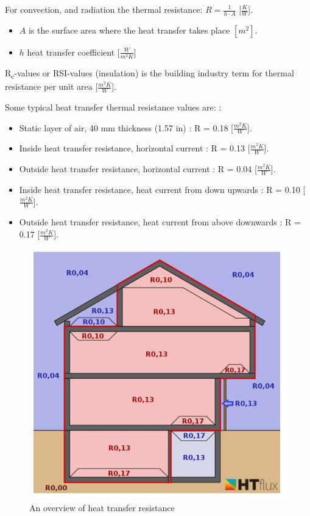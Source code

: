 For convection, and radiation the thermal resistance: $R = \frac{1}{h \cdot A}$ [$\frac{K}{W}$].

\begin{itemize}
    \item $A$ is the surface area where the heat transfer takes place $[m^2]$.
    \item $h$  heat transfer coefficient  [$\frac{W}{m^2K}$]
\end{itemize}

R\textsubscript{c}-values or RSI-values (insulation) is the building industry term for thermal resistance per unit area \cite{Rvalues_insulation} [$\frac{m^2K}{W}$].

Some typical heat transfer thermal resistance values are: \cite{OVERALL}: 

\begin{itemize}
	\item Static layer of air, 40 mm thickness (1.57 in)  : R = 0.18 [$\frac{m^2K}{W}$].
	\item Inside heat transfer resistance, horizontal current : R = 0.13 [$\frac{m^2K}{W}$]. 
	\item Outside heat transfer resistance, horizontal current : R = 0.04 [$\frac{m^2K}{W}$].
	\item Inside heat transfer resistance, heat current from down upwards : R = 0.10 [$\frac{m^2K}{W}$].
	\item Outside heat transfer resistance, heat current from above downwards : R = 0.17 [$\frac{m^2K}{W}$].
	
\end{itemize}

\begin{figure}[H]
	\centering
	\includegraphics[width=0.8\columnwidth]{Pictures/Overview of heat resistances.JPG}
	\caption[Short title]{An overview of heat transfer resistance\cite{SURFREST}}
	\label{fig:overview}
\end{figure}


